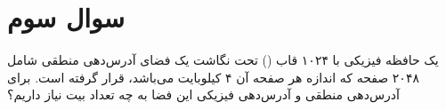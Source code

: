 \section{سوال سوم}


یک حافظه فیزیکی با ۱۰۲۴ قاب () تحت نگاشت یک فضای آدرس‌دهی منطقی شامل ۲۰۴۸ صفحه که اندازه هر صفحه آن ۴ کیلوبایت می‌باشد، قرار گرفته است. برای آدرس‌دهی منطقی و آدرس‌دهی فیزیکی این فضا به چه تعداد بیت نیاز داریم؟